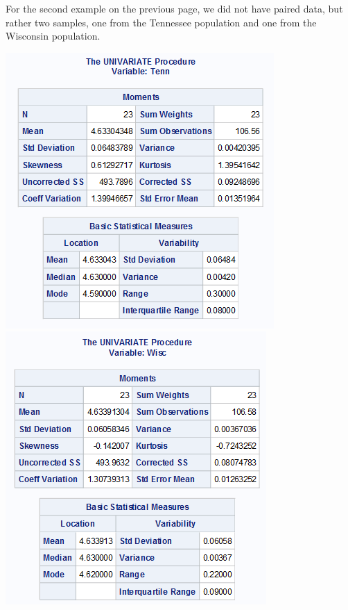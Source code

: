 For the second example on the previous page, we did not have paired data, but rather two samples, one from the Tennessee population and one from the Wisconsin population. 
\begin{center}
\includegraphics[scale=0.70]{catTenn}\includegraphics[scale=0.70]{catWisc}\\

\end{center}
